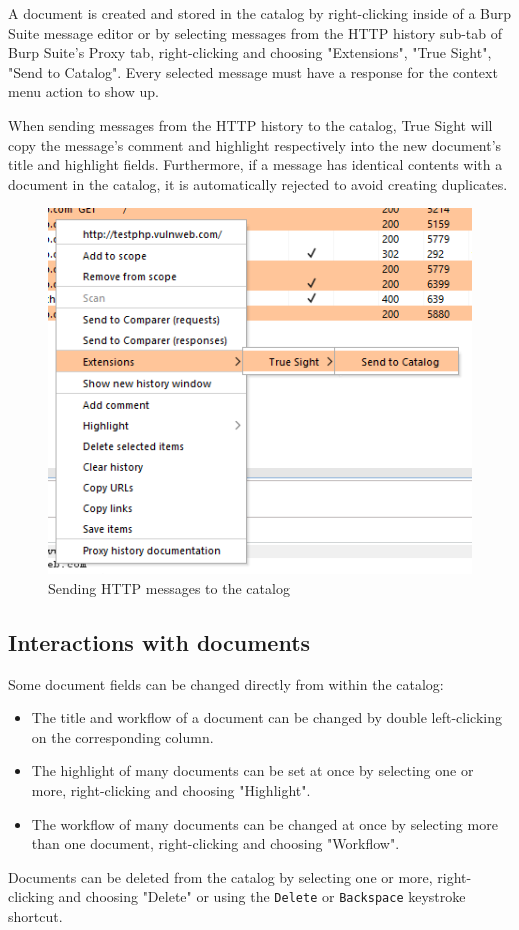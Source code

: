 \documentclass{article}
\begin{document}
A document is created and stored in the catalog by right-clicking inside of a Burp Suite message editor or by selecting messages from the HTTP history sub-tab of Burp Suite's Proxy tab, right-clicking and choosing "Extensions", "True Sight", "Send to Catalog". Every selected message must have a response for the context menu action to show up. 

When sending messages from the HTTP history to the catalog, True Sight will copy the message's comment and highlight respectively into the new document's title and highlight fields. Furthermore, if a message has identical contents with a document in the catalog, it is automatically rejected to avoid creating duplicates.

\begin{figure}[h]
    \centering
    \includegraphics[width=0.5\linewidth]{assets/ctxmenu.png}
    \caption{Sending HTTP messages to the catalog}
    \label{fig:ctxmenu}
\end{figure}

\subsection{Interactions with documents}

Some document fields can be changed directly from within the catalog:
\begin{itemize}
    \item The title and workflow of a document can be changed by double left-clicking on the corresponding column.
    \item The highlight of many documents can be set at once by selecting one or more, right-clicking and choosing "Highlight". 
    \item The workflow of many documents can be changed at once by selecting more than one document, right-clicking and choosing "Workflow".
\end{itemize}

Documents can be deleted from the catalog by selecting one or more, right-clicking and choosing "Delete" or using the \verb|Delete| or \verb|Backspace| keystroke shortcut.
\end{document}
